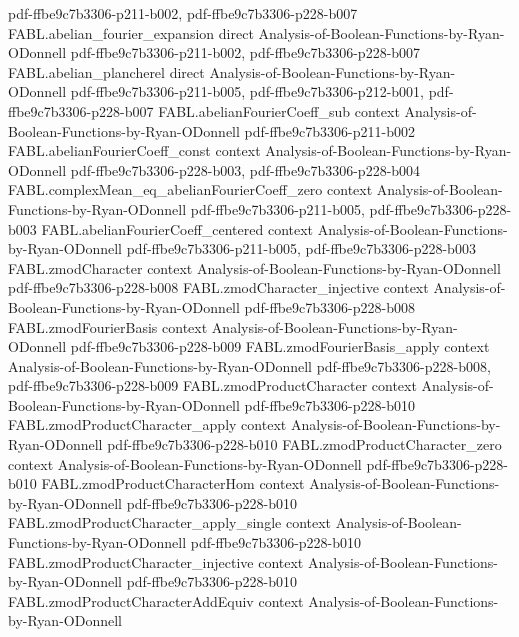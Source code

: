 \begin{theorem}
  {pdf-ffbe9c7b3306-p211-b002,
    pdf-ffbe9c7b3306-p228-b007}
\proofstep
  {FABL.abelian_fourier_expansion}
  {direct}
  {Analysis-of-Boolean-Functions-by-Ryan-ODonnell}
  {pdf-ffbe9c7b3306-p211-b002,
    pdf-ffbe9c7b3306-p228-b007}
\proofstep
  {FABL.abelian_plancherel}
  {direct}
  {Analysis-of-Boolean-Functions-by-Ryan-ODonnell}
  {pdf-ffbe9c7b3306-p211-b005,
    pdf-ffbe9c7b3306-p212-b001,
    pdf-ffbe9c7b3306-p228-b007}
\proofstep
  {FABL.abelianFourierCoeff_sub}
  {context}
  {Analysis-of-Boolean-Functions-by-Ryan-ODonnell}
  {pdf-ffbe9c7b3306-p211-b002}
\proofstep
  {FABL.abelianFourierCoeff_const}
  {context}
  {Analysis-of-Boolean-Functions-by-Ryan-ODonnell}
  {pdf-ffbe9c7b3306-p228-b003,
    pdf-ffbe9c7b3306-p228-b004}
\proofstep
  {FABL.complexMean_eq_abelianFourierCoeff_zero}
  {context}
  {Analysis-of-Boolean-Functions-by-Ryan-ODonnell}
  {pdf-ffbe9c7b3306-p211-b005,
    pdf-ffbe9c7b3306-p228-b003}
\proofstep
  {FABL.abelianFourierCoeff_centered}
  {context}
  {Analysis-of-Boolean-Functions-by-Ryan-ODonnell}
  {pdf-ffbe9c7b3306-p211-b005,
    pdf-ffbe9c7b3306-p228-b003}
\proofstep
  {FABL.zmodCharacter}
  {context}
  {Analysis-of-Boolean-Functions-by-Ryan-ODonnell}
  {pdf-ffbe9c7b3306-p228-b008}
\proofstep
  {FABL.zmodCharacter_injective}
  {context}
  {Analysis-of-Boolean-Functions-by-Ryan-ODonnell}
  {pdf-ffbe9c7b3306-p228-b008}
\proofstep
  {FABL.zmodFourierBasis}
  {context}
  {Analysis-of-Boolean-Functions-by-Ryan-ODonnell}
  {pdf-ffbe9c7b3306-p228-b009}
\proofstep
  {FABL.zmodFourierBasis_apply}
  {context}
  {Analysis-of-Boolean-Functions-by-Ryan-ODonnell}
  {pdf-ffbe9c7b3306-p228-b008,
    pdf-ffbe9c7b3306-p228-b009}
\proofstep
  {FABL.zmodProductCharacter}
  {context}
  {Analysis-of-Boolean-Functions-by-Ryan-ODonnell}
  {pdf-ffbe9c7b3306-p228-b010}
\proofstep
  {FABL.zmodProductCharacter_apply}
  {context}
  {Analysis-of-Boolean-Functions-by-Ryan-ODonnell}
  {pdf-ffbe9c7b3306-p228-b010}
\proofstep
  {FABL.zmodProductCharacter_zero}
  {context}
  {Analysis-of-Boolean-Functions-by-Ryan-ODonnell}
  {pdf-ffbe9c7b3306-p228-b010}
\proofstep
  {FABL.zmodProductCharacterHom}
  {context}
  {Analysis-of-Boolean-Functions-by-Ryan-ODonnell}
  {pdf-ffbe9c7b3306-p228-b010}
\proofstep
  {FABL.zmodProductCharacter_apply_single}
  {context}
  {Analysis-of-Boolean-Functions-by-Ryan-ODonnell}
  {pdf-ffbe9c7b3306-p228-b010}
\proofstep
  {FABL.zmodProductCharacter_injective}
  {context}
  {Analysis-of-Boolean-Functions-by-Ryan-ODonnell}
  {pdf-ffbe9c7b3306-p228-b010}
\proofstep
  {FABL.zmodProductCharacterAddEquiv}
  {context}
  {Analysis-of-Boolean-Functions-by-Ryan-ODonnell}

\end{theorem}
